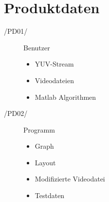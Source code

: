 \section{Produktdaten}

\begin{description}
  \item[/PD01/] Benutzer
    \begin{itemize}
      \item YUV-Stream
      \item Videodateien
      \item Matlab Algorithmen
    \end{itemize}
  \item[/PD02/] Programm
    \begin{itemize}
      \item Graph
      \item Layout
      \item Modifizierte Videodatei
      \item Testdaten
    \end{itemize}
\end{description}
